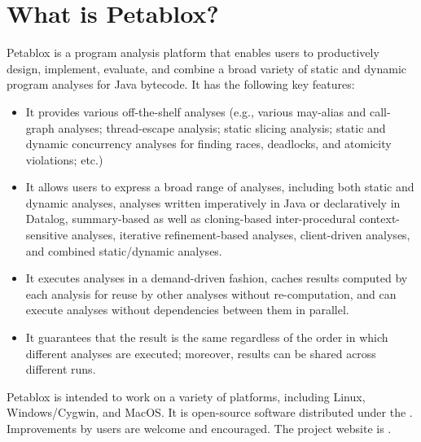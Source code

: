 \chapter{What is Petablox?}
\label{chap:whatis}

Petablox is a program analysis platform that enables users to productively design,
implement, evaluate, and combine a broad variety of static and dynamic program
analyses for Java bytecode. It has the following key features:

\begin{itemize}
\item

It provides various off-the-shelf analyses (e.g., various may-alias and
call-graph analyses; thread-escape analysis; static slicing analysis; static and
dynamic concurrency analyses for finding races, deadlocks, and atomicity
violations; etc.)

\item

It allows users to express a broad range of analyses, including both static and
dynamic analyses, analyses written imperatively in Java or declaratively in
Datalog, summary-based as well as cloning-based inter-procedural
context-sensitive analyses, iterative refinement-based analyses, client-driven
analyses, and combined static/dynamic analyses.

\item

It executes analyses in a demand-driven fashion, caches results computed by each
analysis for reuse by other analyses without re-computation, and can execute
analyses without dependencies between them in parallel.

\item

It guarantees that the result is the same regardless of the order in which
different analyses are executed; moreover, results can be shared across
different runs.
\end{itemize}

Petablox is intended to work on a variety of platforms, including Linux,
Windows/Cygwin, and MacOS.  It is open-source software distributed under
the \bsdlicense.  Improvements by users are welcome and encouraged.  The project
website is \petabloxweb.
